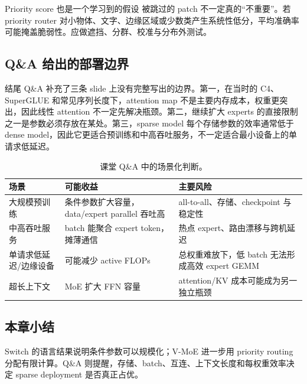 \begin{warningbox}{Priority score 也是一个学习到的假设}
被跳过的 patch 不一定真的“不重要”。若 priority router 对小物体、文字、边缘区域或少数类产生系统性低分，平均准确率可能掩盖脆弱性。应做遮挡、分群、校准与分布外测试。
\end{warningbox}

\subsection{Q\&A 给出的部署边界}

结尾 Q\&A 补充了三条 slide 上没有完整写出的边界。第一，在当时的 C4、SuperGLUE 和常见序列长度下，attention map 不是主要内存成本，权重更突出，因此线性 attention 不一定先解决瓶颈。第二，继续扩大 experts 的直接限制之一是参数必须存放在某处。第三，sparse model 每个存储参数的效率通常低于 dense model，因此它更适合预训练和中高吞吐服务，不一定适合最小设备上的单请求低延迟。

\begin{table}[H]
\centering
\small
\caption{课堂 Q\&A 中的场景化判断。}
\begin{tabularx}{\textwidth}{L{0.28\textwidth}X X}
\toprule
场景 & 可能收益 & 主要风险 \\
\midrule
大规模预训练 & 条件参数扩大容量，data/expert parallel 吞吐高 & all-to-all、存储、checkpoint 与稳定性 \\
中高吞吐服务 & batch 能聚合 expert token，摊薄通信 & 热点 expert、路由漂移与跨机延迟 \\
单请求低延迟/边缘设备 & 可能减少 active FLOPs & 总权重难放下，低 batch 无法形成高效 expert GEMM \\
超长上下文 & MoE 扩大 FFN 容量 & attention/KV 成本可能成为另一独立瓶颈 \\
\bottomrule
\end{tabularx}
\end{table}


\subsection{本章小结}

Switch 的语言结果说明条件参数可以规模化；V-MoE 进一步用 priority routing 分配有限计算。Q\&A 则提醒，存储、batch、互连、上下文长度和每权重效率决定 sparse deployment 是否真正占优。

